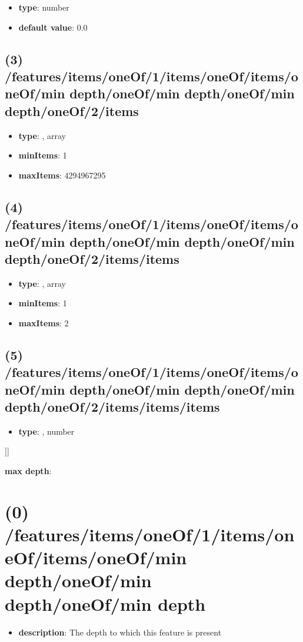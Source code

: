 \begin{itemize}[leftmargin=4em]\item {\bf type}: number\item {\bf default value}: 0.0
\end{itemize}\subsection{(3) /features/items/oneOf/1/items/oneOf/items/oneOf/min depth/oneOf/min depth/oneOf/min depth/oneOf/2/items}
\begin{itemize}[leftmargin=3em]\item {\bf type}: , array\item {\bf minItems}: 1
\item {\bf maxItems}: 4294967295
\end{itemize}\subsection{(4) /features/items/oneOf/1/items/oneOf/items/oneOf/min depth/oneOf/min depth/oneOf/min depth/oneOf/2/items/items}
\begin{itemize}[leftmargin=4em]\item {\bf type}: , array\item {\bf minItems}: 1
\item {\bf maxItems}: 2
\end{itemize}\subsection{(5) /features/items/oneOf/1/items/oneOf/items/oneOf/min depth/oneOf/min depth/oneOf/min depth/oneOf/2/items/items/items}
\begin{itemize}[leftmargin=5em]\item {\bf type}: , number\end{itemize}]]\item {\bf max depth}: \section{(0) /features/items/oneOf/1/items/oneOf/items/oneOf/min depth/oneOf/min depth/oneOf/min depth}
\begin{itemize}[leftmargin=0em]\item {\bf description}: The depth to which this feature is present
\end{itemize}

